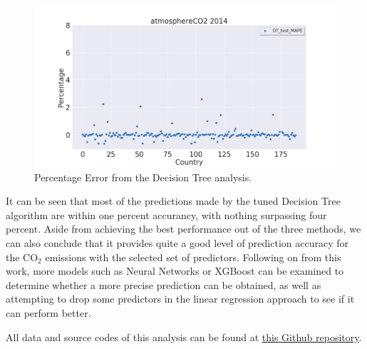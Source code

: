 \documentclass[11pt,a4paper,titlepage]{article}
\begin{document}
\begin{figure}[!htbp]
    \begin{center}
        \includegraphics[width=\textwidth]{../Plots/atmosphereCO2_test_DT_MAPE.png}
        \caption{Percentage Error from the Decision Tree analysis.}
        \label{fig:atmosphereCO2_test_DT_MAPE}
    \end{center}
\end{figure}

It can be seen that most of the predictions made by the tuned Decision Tree algorithm are within one percent accurancy, with nothing surpassing four percent. Aside from achieving the best performance out of the three methods, we can also conclude that it provides quite a good level of prediction accuracy for the CO$_{2}$ emissions with the selected set of predictors. Following on from this work, more models such as Neural Networks or XGBoost can be examined to determine whether a more precise prediction can be obtained, as well as attempting to drop some predictors in the linear regression approach to see if it can perform better.

All data and source codes of this analysis can be found at \href{https://github.com/jasonyctam/WorldBankClimateChange_PySpark}{this Github repository}.
\end{document}
